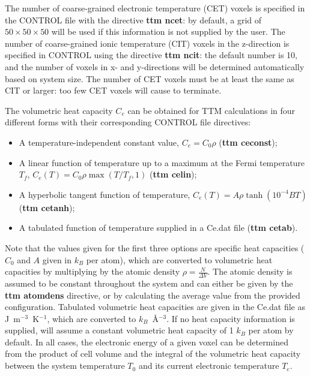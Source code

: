 The number of coarse-grained electronic temperature (CET) voxels is 
specified in the CONTROL file with the directive {\bf ttm ncet}: by default, 
a grid of $50 \times 50 \times 50$ will be used if this information is not 
supplied by the user. The number of coarse-grained ionic temperature (CIT) 
voxels in the z-direction is specified in CONTROL using the directive 
{\bf ttm ncit}: the default number is 10, and the number of voxels in x- 
and y-directions will be determined automatically based on system size. 
The number of CET voxels must be at least the same as CIT or larger: 
too few CET voxels will cause \D to terminate.

The volumetric heat capacity $C_e$ 
can be obtained for TTM calculations in four different forms with their 
corresponding CONTROL file directives: 
\begin{itemize}
\item A temperature-independent constant value, $C_e = C_0 \rho$ ({\bf ttm ceconst});
\item A linear function of temperature up to a maximum at the Fermi temperature $T_{f}$, $C_e (T) = C_0 \rho \max \left(T/T_{f}, 1\right)$ ({\bf ttm celin});
\item A hyperbolic tangent function of temperature, $C_e (T) = A \rho \tanh \left(10^{-4} B T\right)$ ({\bf ttm cetanh});
\item A tabulated function of temperature supplied in a Ce.dat file  ({\bf ttm cetab}).
\end{itemize}
Note that the values given for the first three options are specific heat 
capacities ($C_0$ and $A$ given in $k_B$ per atom), which are 
converted to volumetric heat capacities by multiplying by the atomic 
density $\rho = \frac{N}{\Delta V}$. The atomic density is assumed to 
be constant throughout the system and can either be given by the 
{\bf ttm atomdens} directive, or by calculating the average value from 
the provided configuration. Tabulated volumetric heat capacities are given 
in the Ce.dat file as J~m$^{-3}$~K$^{-1}$, which are converted to 
$k_B$~\AA$^{-3}$. If no heat capacity information is supplied, \D will 
assume a constant volumetric heat capacity of 1 $k_B$ per atom by 
default. In all cases, the electronic energy of a given voxel can be 
determined from the product of cell volume and the integral of the 
volumetric heat capacity between the system temperature $T_0$ 
and its current electronic temperature $T_e$.

